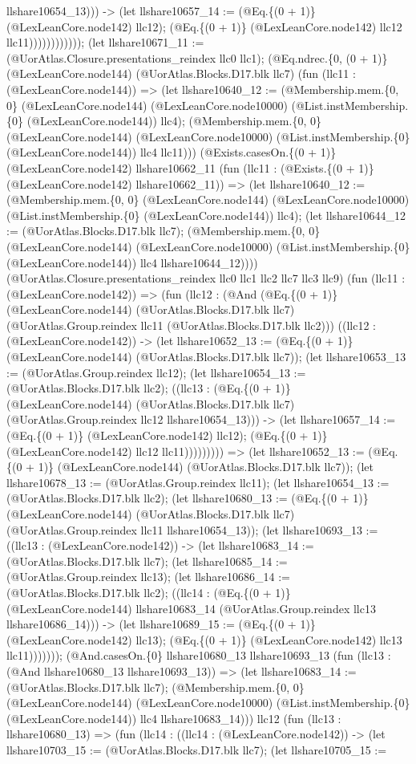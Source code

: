\documentclass[11pt]{article}
\begin{document}
llshare10654\_13))) -> (let llshare10657\_14 := (@Eq.\{(0 + 1)\} (@LexLeanCore.node142) llc12); (@Eq.\{(0 + 1)\} (@LexLeanCore.node142) llc12 llc11)))))))))))); (let llshare10671\_11 := (@UorAtlas.Closure.presentations\_reindex llc0 llc1); (@Eq.ndrec.\{0, (0 + 1)\} (@LexLeanCore.node144) (@UorAtlas.Blocks.D17.blk llc7) (fun (llc11 : (@LexLeanCore.node144)) => (let llshare10640\_12 := (@Membership.mem.\{0, 0\} (@LexLeanCore.node144) (@LexLeanCore.node10000) (@List.instMembership.\{0\} (@LexLeanCore.node144)) llc4); (@Membership.mem.\{0, 0\} (@LexLeanCore.node144) (@LexLeanCore.node10000) (@List.instMembership.\{0\} (@LexLeanCore.node144)) llc4 llc11))) (@Exists.casesOn.\{(0 + 1)\} (@LexLeanCore.node142) llshare10662\_11 (fun (llc11 : (@Exists.\{(0 + 1)\} (@LexLeanCore.node142) llshare10662\_11)) => (let llshare10640\_12 := (@Membership.mem.\{0, 0\} (@LexLeanCore.node144) (@LexLeanCore.node10000) (@List.instMembership.\{0\} (@LexLeanCore.node144)) llc4); (let llshare10644\_12 := (@UorAtlas.Blocks.D17.blk llc7); (@Membership.mem.\{0, 0\} (@LexLeanCore.node144) (@LexLeanCore.node10000) (@List.instMembership.\{0\} (@LexLeanCore.node144)) llc4 llshare10644\_12)))) (@UorAtlas.Closure.presentations\_reindex llc0 llc1 llc2 llc7 llc3 llc9) (fun (llc11 : (@LexLeanCore.node142)) => (fun (llc12 : (@And (@Eq.\{(0 + 1)\} (@LexLeanCore.node144) (@UorAtlas.Blocks.D17.blk llc7) (@UorAtlas.Group.reindex llc11 (@UorAtlas.Blocks.D17.blk llc2))) ((llc12 : (@LexLeanCore.node142)) -> (let llshare10652\_13 := (@Eq.\{(0 + 1)\} (@LexLeanCore.node144) (@UorAtlas.Blocks.D17.blk llc7)); (let llshare10653\_13 := (@UorAtlas.Group.reindex llc12); (let llshare10654\_13 := (@UorAtlas.Blocks.D17.blk llc2); ((llc13 : (@Eq.\{(0 + 1)\} (@LexLeanCore.node144) (@UorAtlas.Blocks.D17.blk llc7) (@UorAtlas.Group.reindex llc12 llshare10654\_13))) -> (let llshare10657\_14 := (@Eq.\{(0 + 1)\} (@LexLeanCore.node142) llc12); (@Eq.\{(0 + 1)\} (@LexLeanCore.node142) llc12 llc11))))))))) => (let llshare10652\_13 := (@Eq.\{(0 + 1)\} (@LexLeanCore.node144) (@UorAtlas.Blocks.D17.blk llc7)); (let llshare10678\_13 := (@UorAtlas.Group.reindex llc11); (let llshare10654\_13 := (@UorAtlas.Blocks.D17.blk llc2); (let llshare10680\_13 := (@Eq.\{(0 + 1)\} (@LexLeanCore.node144) (@UorAtlas.Blocks.D17.blk llc7) (@UorAtlas.Group.reindex llc11 llshare10654\_13)); (let llshare10693\_13 := ((llc13 : (@LexLeanCore.node142)) -> (let llshare10683\_14 := (@UorAtlas.Blocks.D17.blk llc7); (let llshare10685\_14 := (@UorAtlas.Group.reindex llc13); (let llshare10686\_14 := (@UorAtlas.Blocks.D17.blk llc2); ((llc14 : (@Eq.\{(0 + 1)\} (@LexLeanCore.node144) llshare10683\_14 (@UorAtlas.Group.reindex llc13 llshare10686\_14))) -> (let llshare10689\_15 := (@Eq.\{(0 + 1)\} (@LexLeanCore.node142) llc13); (@Eq.\{(0 + 1)\} (@LexLeanCore.node142) llc13 llc11))))))); (@And.casesOn.\{0\} llshare10680\_13 llshare10693\_13 (fun (llc13 : (@And llshare10680\_13 llshare10693\_13)) => (let llshare10683\_14 := (@UorAtlas.Blocks.D17.blk llc7); (@Membership.mem.\{0, 0\} (@LexLeanCore.node144) (@LexLeanCore.node10000) (@List.instMembership.\{0\} (@LexLeanCore.node144)) llc4 llshare10683\_14))) llc12 (fun (llc13 : llshare10680\_13) => (fun (llc14 : ((llc14 : (@LexLeanCore.node142)) -> (let llshare10703\_15 := (@UorAtlas.Blocks.D17.blk llc7); (let llshare10705\_15 := 
\end{document}

